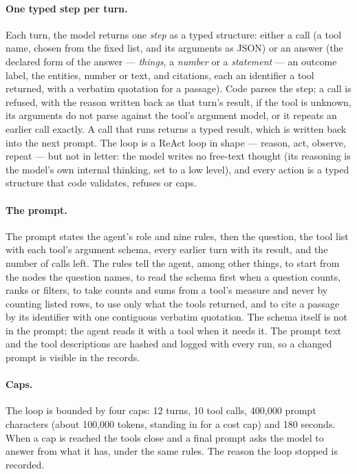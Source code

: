 \paragraph{One typed step per turn.} Each turn, the model returns one \emph{step} as a typed structure: either a
call (a tool name, chosen from the fixed list, and its arguments as JSON) or an answer (the declared form of the
answer --- \emph{things}, a \emph{number} or a \emph{statement} --- an outcome label, the entities, number or text,
and citations, each an identifier a tool returned, with a verbatim quotation for a passage). Code parses the step;
a call is refused, with the reason written back as that turn's result, if the tool is unknown, its arguments do not
parse against the tool's argument model, or it repeats an earlier call exactly. A call that runs returns a typed
result, which is written back into the next prompt. The loop is a ReAct loop in shape --- reason, act, observe,
repeat --- but not in letter: the model writes no free-text thought (its reasoning is the model's own internal
thinking, set to a low level), and every action is a typed structure that code validates, refuses or caps.

\paragraph{The prompt.} The prompt states the agent's role and nine rules, then the question, the tool list with
each tool's argument schema, every earlier turn with its result, and the number of calls left. The rules tell the
agent, among other things, to start from the nodes the question names, to read the schema first when a question
counts, ranks or filters, to take counts and sums from a tool's measure and never by counting listed rows, to use
only what the tools returned, and to cite a passage by its identifier with one contiguous verbatim quotation. The
schema itself is not in the prompt; the agent reads it with a tool when it needs it. The prompt text and the tool
descriptions are hashed and logged with every run, so a changed prompt is visible in the records.

\paragraph{Caps.} The loop is bounded by four caps: 12 turns, 10 tool calls, 400{,}000 prompt characters (about
100{,}000 tokens, standing in for a cost cap) and 180 seconds. When a cap is reached the tools close and a final
prompt asks the model to answer from what it has, under the same rules. The reason the loop stopped is recorded.

